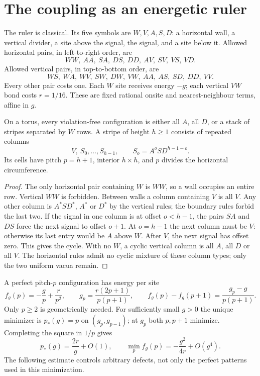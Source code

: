 \section{The coupling as an energetic ruler}\label{sec:ruler}
The ruler is classical. Its five symbols are $W,V,A,S,D$: a horizontal
wall, a vertical divider, a site above the signal, the signal, and a
site below it. Allowed horizontal pairs, in left-to-right order, are
\[
 WW,\ AA,\ SA,\ DS,\ DD,\ AV,\ SV,\ VS,\ VD.
\]
Allowed vertical pairs, in top-to-bottom order, are
\[
 WS,\ WA,\ WV,\ SW,\ DW,\ VW,\ AA,\ AS,\ SD,\ DD,\ VV.
\]
Every other pair costs one. Each $W$ site receives energy $-g$;
each vertical $VW$ bond costs $r=1/16$. These are fixed rational
onsite and nearest-neighbour terms, affine in $g$.

\begin{lemma}\label{lem:forcing}
On a torus, every violation-free configuration is either all $A$, all
$D$, or a stack of stripes separated by $W$ rows. A stripe of height
$h\geq1$ consists of repeated columns
\[
 V,\ S_0,\ldots,S_{h-1},\qquad S_o=A^o S D^{h-1-o}.
\]
Its cells have pitch $p=h+1$, interior $h\times h$, and $p$ divides
the horizontal circumference.
\end{lemma}
\begin{proof}
The only horizontal pair containing $W$ is $WW$, so a wall occupies an
entire row. Vertical $WW$ is forbidden. Between walls a column
containing $V$ is all $V$. Any other column is $A^*SD^*$, $A^*$ or
$D^*$ by the vertical rules; the boundary rules forbid the last two.
If the signal in one column is at offset $o<h-1$, the pairs $SA$
and $DS$ force the next signal to offset $o+1$. At $o=h-1$ the next
column must be $V$: otherwise its last entry would be $A$ above $W$.
After $V$, the next signal has offset zero. This gives the cycle.
With no $W$, a cyclic vertical column is all $A$, all $D$ or all $V$.
The horizontal rules admit no cyclic mixture of these column types;
only the two uniform vacua remain.
\end{proof}

A perfect pitch-$p$ configuration has energy per site
\begin{equation}\label{eq:ruler-energy}
 f_g(p)=-\frac gp+\frac r{p^2},\qquad
 g_p=\frac{r(2p+1)}{p(p+1)},\qquad
 f_g(p)-f_g(p+1)=\frac{g_p-g}{p(p+1)}.
\end{equation}
Only $p\geq2$ is geometrically needed. For sufficiently small $g>0$
the unique minimizer is $p_*(g)=p$ on $(g_p,g_{p-1})$; at $g_p$ both
$p,p+1$ minimize. Completing the square in $1/p$ gives
\begin{equation}\label{eq:ruler-asymptotic}
 p_*(g)=\frac{2r}{g}+O(1),\qquad
 \min_p f_g(p)=-\frac{g^2}{4r}+O(g^4).
\end{equation}
The following estimate controls arbitrary defects, not only the perfect
patterns used in this minimization.

